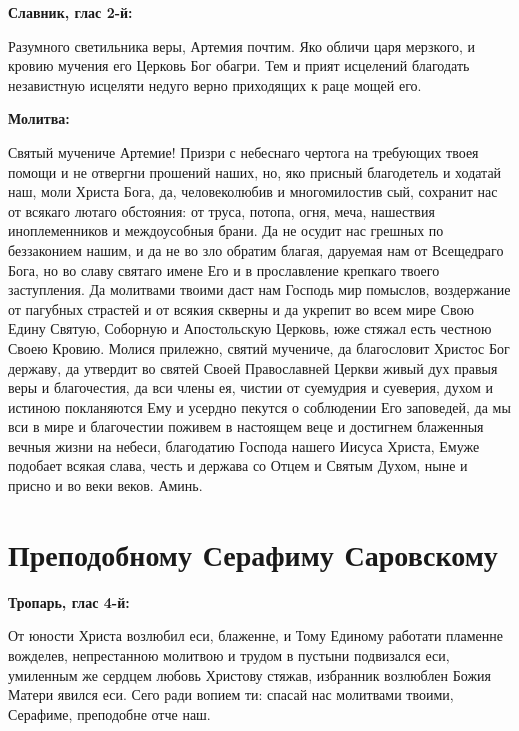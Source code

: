 \medskip


\bfseries Славник, глас 2-й:\normalfont{}\nopagebreak


Разумного светильника веры, Артемия почтим. Яко обличи царя мерзкого, и кровию мучения его Церковь Бог обагри. Тем и прият исцелений благодать независтную исцеляти недуго верно приходящих к раце мощей его.


\medskip


\bfseries Молитва:\normalfont{}\nopagebreak


Святый мучениче Артемие! Призри с небеснаго чертога на требующих твоея помощи и не отвергни прошений наших, но, яко присный благодетель и ходатай наш, моли Христа Бога, да, человеколюбив и многомилостив сый, сохранит нас от всякаго лютаго обстояния: от труса, потопа, огня, меча, нашествия иноплеменников и междоусобныя брани. Да не осудит нас грешных по беззаконием нашим, и да не во зло обратим благая, даруемая нам от Всещедраго Бога, но во славу святаго имене Его и в прославление крепкаго твоего заступления. Да молитвами твоими даст нам Господь мир помыслов, воздержание от пагубных страстей и от всякия скверны и да укрепит во всем мире Свою Едину Святую, Соборную и Апостольскую Церковь, юже стяжал есть честною Своею Кровию. Молися прилежно, святий мучениче, да благословит Христос Бог державу, да утвердит во святей Своей Православней Церкви живый дух правыя веры и благочестия, да вси члены ея, чистии от суемудрия и суеверия, духом и истиною покланяются Ему и усердно пекутся о соблюдении Его заповедей, да мы вси в мире и благочестии поживем в настоящем веце и достигнем блаженныя вечныя жизни на небеси, благодатию Господа нашего Иисуса Христа, Емуже подобает всякая слава, честь и держава со Отцем и Святым Духом, ныне и присно и во веки веков. Аминь.


\section{Преподобному Серафиму Саровскому}
 


\bfseries Тропарь, глас 4-й:\normalfont{}\nopagebreak


От юности Христа возлюбил еси, блаженне, и Тому Единому работати пламенне вожделев, непрестанною молитвою и трудом в пустыни подвизался еси, умиленным же сердцем любовь Христову стяжав, избранник возлюблен Божия Матери явился еси. Сего ради вопием ти: спасай нас молитвами твоими, Серафиме, преподобне отче наш.


